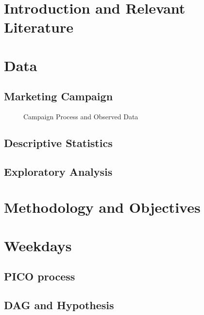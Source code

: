 \documentclass[
  12pt,
]{article}
\author{}
\date{}
\begin{document}



\clearpage

\section{Introduction and Relevant
Literature}\label{introduction-and-relevant-literature}

\newpage

\section{Data}\label{data}

\subsection{Marketing Campaign}\label{marketing-campaign}

\begin{figure}
\centering
\caption{Campaign Process and Observed Data}
\end{figure}

\subsection{Descriptive Statistics}\label{descriptive-statistics}

\subsection{Exploratory Analysis}\label{exploratory-analysis}

\newpage

\section{Methodology and Objectives}\label{methodology-and-objectives}

\newpage

\section{Weekdays}\label{weekdays}

\subsection{PICO process}\label{pico-process}

\subsection{DAG and Hypothesis}\label{dag-and-hypothesis}
\end{document}
